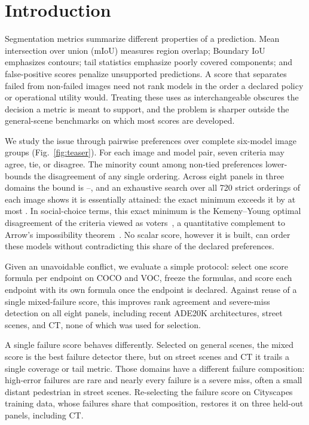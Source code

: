 \section{Introduction}

Segmentation metrics summarize different properties of a prediction. Mean
intersection over union (mIoU) measures region overlap; Boundary IoU emphasizes
contours; tail statistics emphasize poorly covered components; and
false-positive scores penalize unsupported predictions. A score that separates
failed from non-failed images need not rank models in the order a declared
policy or operational utility would. Treating these uses as interchangeable
obscures the decision a metric is meant to support, and the problem is sharper
outside the general-scene benchmarks on which most scores are developed.

We study the issue through pairwise preferences over complete six-model image
groups (Fig.~\ref{fig:teaser}). For each image and model pair, seven criteria
may agree, tie, or disagree. The minority count among non-tied preferences
lower-bounds the disagreement of any single ordering. Across eight panels in
three domains the bound is \NBAllMin{}--\NBAllMax{}, and an exhaustive search
over all 720 strict orderings of each image shows it is essentially attained:
the exact minimum exceeds it by at most \NBGapAllMax{}. In social-choice terms,
this exact minimum is the Kemeny--Young optimal disagreement of the criteria
viewed as voters~\cite{kemeny1959mathematics}, a quantitative complement to
Arrow's impossibility theorem~\cite{arrow1951social}. No scalar score, however
it is built, can order these models without contradicting this share of the
declared preferences.

Given an unavoidable conflict, we evaluate a simple protocol: select one score
formula per endpoint on COCO and VOC, freeze the formulas, and score each
endpoint with its own formula once the endpoint is declared. Against reuse of a
single mixed-failure score, this improves rank agreement and severe-miss
detection on all eight panels, including recent ADE20K architectures, street
scenes, and CT, none of which was used for selection.

A single failure score behaves differently. Selected on general scenes, the
mixed score is the best failure detector there, but on street scenes and CT it
trails a single coverage or tail metric. Those domains have a different failure
composition: high-error failures are rare and nearly every failure is a severe
miss, often a small distant pedestrian in street scenes. Re-selecting the
failure score on Cityscapes training data, whose failures share that
composition, restores it on three held-out panels, including CT.

